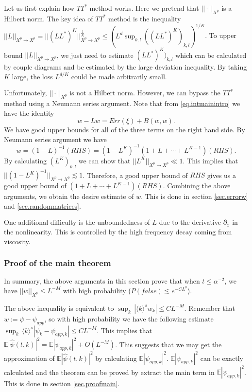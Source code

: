 Let us first explain how $TT^*$ method works. Here we pretend that $||\cdot||_{X^p}$ is a Hilbert norm. The key idea of $TT^*$ method is the inequality $||L||_{X^p\rightarrow X^p}=||(LL^*)^K||_{X^p\rightarrow X^p}^{\frac{1}{K}}\le (L^d\sup_{k,l} ((LL^*)^K)_{k,l})^{1/K}$. To upper bound $||L||_{X^p\rightarrow X^p}$, we just need to estimate $(LL^*)^K)_{k,l}$ which can be calculated by couple diagrams and be estimated by the large deviation inequality. By taking $K$ large, the loss $L^{d/K}$ could be made arbitrarily small.

Unfortunately, $||\cdot||_{X^p}$ is not a Hilbert norm. However, we can bypass the $TT^*$ method using a Neumann series argument. Note that from \eqref{eq.intmainintro} we have the identity
\begin{equation}
    w-Lw= Err(\xi)+B(w,w).
\end{equation}
We have good upper bounds for all of the three terms on the right hand side. By Neumann series argument we have
\begin{equation}
    w= (1-L)^{-1}(\textit{RHS}) =(1-L^K)^{-1}(1+L+\cdots+L^{K-1})(\textit{RHS}).
\end{equation}
By calculating $(L^K)_{k,l}$ we can show that $||L^K||_{X^p\rightarrow X^p}\ll 1$. This implies that $||(1-L^K)^{-1}||_{X^p\rightarrow X^p}\lesssim 1$. Therefore, a good upper bound of $\textit{RHS}$ gives us a good upper bound of $(1+L+\cdots+L^{K-1})(\textit{RHS})$. Combining the above arguments, we obtain the desire estimate of $w$. This is done in section \ref{sec.errorw} and \ref{sec.randommatrices}.

One additional difficulty is the unboundedness of $L$ due to the derivative $\partial_x$ in the nonlinearity. This is controlled by the high frequency decay coming from viscosity.

\subsubsection{Proof of the main theorem} In summary, the above arguments in this section prove that when $t\le \alpha^{-2}$, we have $||w||_{X^p}\le L^{-M}$ with high probability ($P(\textit{false})\lesssim e^{-CL^{\theta}}$).   


The above inequality is equivalent to $\sup_k\, |\langle k \rangle^s w_k|\le CL^{-M}$. Remember that $w:=\psi-\psi_{app}$, so with high probability we have the following estimate $\sup_k\, \langle k \rangle^s |\psi_k-\psi_{app,k}|\le CL^{-M}$. This implies that $\mathbb E |\widehat \psi(t, k)|^2=\mathbb E |\psi_{app,k}|^2+O(L^{-M})$. This suggests that we may get the approximation of $\mathbb E |\widehat \psi(t, k)|^2$ by calculating $\mathbb E |\psi_{app,k}|^2$. $\mathbb E |\psi_{app,k}|^2$ can be exactly calculated and the theorem can be proved by extract the main term in $\mathbb E |\psi_{app,k}|^2$. This is done in section \ref{sec.proofmain}.

